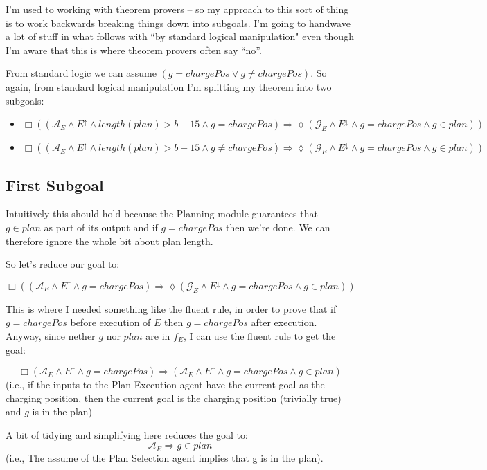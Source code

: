 \documentclass{blue-book}
\let\sometime=\lozenge
\let\always=\Box
\begin{document}
I'm used to working with theorem provers -- so my approach to this sort of thing is to work backwards breaking things down into subgoals.  I'm going to handwave a lot of stuff in what follows with ``by standard logical manipulation" even though I'm aware that this is where theorem provers often say ``no''.

From standard logic we can assume $ (g = chargePos \lor g \neq chargePos)$.   So again, from standard logical manipulation I'm splitting my theorem into two subgoals:
 
 \begin{itemize}
 \item$\always ((\mathcal{A}_E  \land E^{\uparrow} \land length(plan) > b - 15 \land g = chargePos) \Rightarrow \sometime (\mathcal{G}_E \land E^{\downarrow} \land g = chargePos \land  g \in plan))$
 \item $\always ((\mathcal{A}_E  \land E^{\uparrow} \land  length(plan) > b - 15 \land g \neq chargePos) \Rightarrow \sometime (\mathcal{G}_E \land E^{\downarrow} \land g = chargePos \land  g \in plan))$
 \end{itemize}
  
 \subsection{First Subgoal}
 Intuitively this should hold because the Planning module guarantees that $g \in plan$ as part of its output and if $g=chargePos$ then we're done.  
 We can therefore ignore the whole bit about plan length.  
 
 So let's reduce our goal to:
 
 $$\always ((\mathcal{A}_E \land E^{\uparrow} \land  g = chargePos) \Rightarrow \sometime (\mathcal{G}_E \land E^{\downarrow} \land g = chargePos \land  g \in plan))$$
 
This is where I needed something like the fluent rule, in order to prove that if $g=chargePos$ before execution of $E$ then $g=chargePos$ after execution.  Anyway, since nether $g$ nor $plan$ are in $f_E$, I can use the fluent rule to get the goal:

$$\always (\mathcal{A}_E \land E^{\uparrow} \land   g = chargePos) \Rightarrow (\mathcal{A}_E \land E^{\uparrow} \land g = chargePos \land g \in plan)$$
(i.e., if the inputs to the Plan Execution agent have the current goal as the charging position, then the current goal is the charging position (trivially true) and $g$ is in the plan)

A bit of tidying and simplifying here reduces the goal to: 
$$\mathcal{A}_E \Rightarrow g \in plan$$
(i.e., The assume of the Plan Selection agent implies that  g is in the plan).
\end{document}
